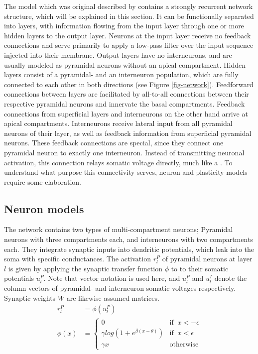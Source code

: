 The model which was original described by \cite{sacramento2018dendritic} contains a strongly recurrent network structure, which
will be explained in this section. It can be functionally separated into layers, with information flowing from the input
layer through one or more hidden layers to the output layer. Neurons at the input layer receive no feedback connections
and serve primarily to
apply a low-pass filter over the input sequence injected into their membrane.
Output layers have no interneurons, and are usually modeled as pyramidal neurons without an apical compartment.
Hidden layers consist of a pyramidal- and an
interneuron population, which are fully connected to each other in both directions (see Figure \ref{fig-network}).
Feedforward connections between layers are facilitated by all-to-all connections between their respective pyramidal neurons
and innervate the basal compartments. Feedback connections from superficial layers and interneurons on the other hand
arrive at apical compartments. Interneurons receive lateral input from all pyramidal neurons of their layer, as well as
feedback information from superficial pyramidal neurons. These feedback connections are special, since they connect one
pyramidal neuron to exactly one interneuron. Instead of transmitting neuronal activation, this connection relays somatic
voltage directly, much like a . To understand what purpose this connectivity serves,
neuron and plasticity models require some elaboration.


\subsection{Neuron models}\label{sec-neurons}



The network contains two types of multi-compartment neurons; Pyramidal neurons with three compartments each, and
interneurons with two compartments each. They integrate synaptic inputs into dendritic potentials,
which leak into the soma with specific conductances. The activation $r_l^P$ of pyramidal neurons at layer $l$ is given by applying
the synaptic transfer function $\phi$ to to their somatic potentials $u_l^P$. Note that vector notation is used here,
and $u_l^P$ and $u_l^I$ denote the column vectors of pyramidal- and interneuron somatic voltages respectively. Synaptic
weights $W$ are likewise assumed matrices.
\begin{align}
  r_l^P   & = \phi(u_l^P)                                                      \\
  \phi(x) & = \begin{cases}
                0                                 & \textrm{if } \ x < -\epsilon \\
                \gamma log(1+e^{\beta(x-\theta)}) & \textrm{if } \ x < \epsilon  \\
                \gamma x                          & \textrm{otherwise}
              \end{cases}
\end{align}

